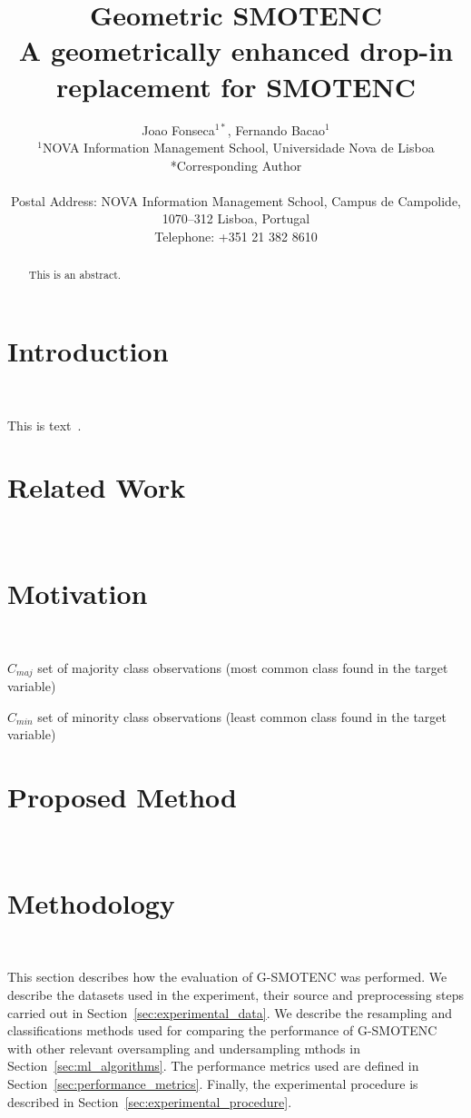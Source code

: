 \documentclass[parskip=full]{scrartcl}
\title{Geometric SMOTENC \\ \LARGE{A geometrically enhanced drop-in
replacement for SMOTENC}}
\author{%
	Joao Fonseca\(^{1*}\), Fernando Bacao\(^{1}\)
	\\
	\small{\(^{1}\)NOVA Information Management School, Universidade Nova de Lisboa}
	\\
	\small{*Corresponding Author}
	\\
	\\
	\small{Postal Address: NOVA Information Management School, Campus de
    Campolide, 1070--312 Lisboa, Portugal}
	\\
	\small{Telephone: +351 21 382 8610}
}
\date{}
\begin{document}
\maketitle

\begin{abstract}
    This is an abstract.
\end{abstract}

\section{Introduction}~\label{sec:introduction}

This is text~\cite{Chawla2002}.

\section{Related Work}~\label{sec:related_work}

\section{Motivation}~\label{sec:motivation}

$C_{maj}$ set of majority class observations (most common class found in the
target variable)

$C_{min}$ set of minority class observations (least common class found in the
target variable)


\section{Proposed Method}~\label{sec:proposed_method}

\section{Methodology}~\label{sec:methodology}

This section describes how the evaluation of G-SMOTENC was performed.  We
describe the datasets used in the experiment, their source and preprocessing
steps carried out in Section~\ref{sec:experimental_data}. We describe the
resampling and classifications methods used for comparing the performance of
G-SMOTENC with other relevant oversampling and undersampling mthods in
Section~\ref{sec:ml_algorithms}. The performance metrics used are defined in
Section~\ref{sec:performance_metrics}. Finally, the experimental procedure is
described in Section~\ref{sec:experimental_procedure}.
\end{document}
